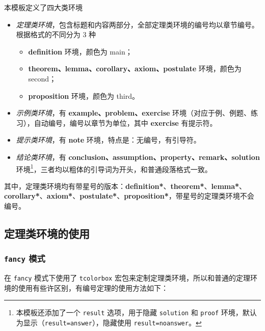 \documentclass[lang=cn,10pt,scheme=chinese]{boyogalaelegantbook}
\begin{document}
本模板定义了四大类环境

\begin{itemize}
  \item \textit{定理类环境}，包含标题和内容两部分，全部定理类环境的编号均以章节编号。根据格式的不同分为 3 种
    \begin{itemize}
      \item \textcolor{main}{\textbf{definition}} 环境，颜色为 \textcolor{main}{main}；
      \item \textcolor{second}{\textbf{theorem、lemma、corollary、axiom、postulate}} 环境，颜色为 \textcolor{second} {second}；
      \item \textcolor{third}{\textbf{proposition}} 环境，颜色为 \textcolor{third}{third}。
    \end{itemize}
  \item \textit{示例类环境}，有 \textbf{example、problem、exercise} 环境（对应于例、例题、练习），自动编号，编号以章节为单位，其中 \textbf{exercise} 有提示符。
  \item \textit{提示类环境}，有 \textbf{note} 环境，特点是：无编号，有引导符。
  \item \textit{结论类环境}，有 \textbf{conclusion、assumption、property、remark、solution} 环境\footnote{本模板还添加了一个 \lstinline|result| 选项，用于隐藏 \lstinline{solution} 和 \lstinline{proof} 环境，默认为显示（\lstinline{result=answer}），隐藏使用 \lstinline{result=noanswer}。}，三者均以粗体的引导词为开头，和普通段落格式一致。
\end{itemize}

其中，定理类环境均有带星号的版本：\textcolor{main}{\textbf{definition*}}、\textcolor{second}{\textbf{theorem*}}、\textcolor{second}{\textbf{lemma*}}、\textcolor{second}{\textbf{corollary*}}、\textcolor{second}{\textbf{axiom*}}、\textcolor{second}{\textbf{postulate*}}、\textcolor{third}{\textbf{proposition*}}，带星号的定理类环境不会编号。

\subsection{定理类环境的使用}

\subsubsection{\texttt{fancy} 模式}

在 \lstinline{fancy} 模式下使用了 \lstinline{tcolorbox} 宏包来定制定理类环境，所以和普通的定理环境的使用有些许区别，有编号定理的使用方法如下：
\end{document}
